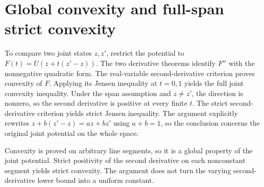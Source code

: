 \documentclass[11pt,a4paper]{article}
\begin{document}
\section{\texorpdfstring{Global convexity and full-span strict convexity}{Global convexity and full-span strict convexity}}


To compare two joint states \(z,z'\), restrict the potential to \(F(t)=U(z+t(z'-z))\). The two derivative theorems identify \(F''\) with the nonnegative quadratic form. The real-variable second-derivative criterion proves convexity of \(F\). Applying its Jensen inequality at \(t=0,1\) yields the full joint convexity inequality. Under the span assumption and \(z\ne z'\), the direction is nonzero, so the second derivative is positive at every finite \(t\). The strict second-derivative criterion yields strict Jensen inequality. The argument explicitly rewrites \(z+b(z'-z)=az+bz'\) using \(a+b=1\), so the conclusion concerns the original joint potential on the whole space.



Convexity is proved on arbitrary line segments, so it is a global property of the joint potential. Strict positivity of the second derivative on each nonconstant segment yields strict convexity. The argument does not turn the varying second-derivative lower bound into a uniform constant.
\end{document}
